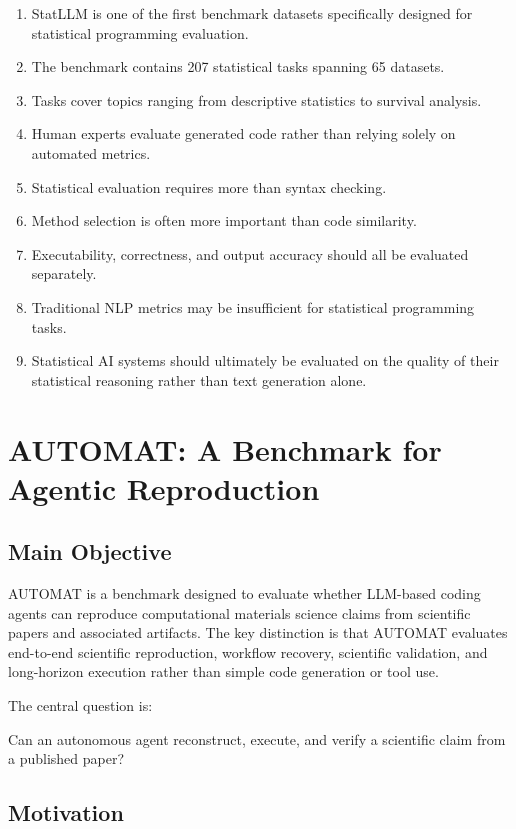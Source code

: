 \documentclass[11pt]{article}
\begin{document}
\begin{enumerate}
    \item StatLLM is one of the first benchmark datasets specifically designed for statistical programming evaluation.
    \item The benchmark contains 207 statistical tasks spanning 65 datasets.
    \item Tasks cover topics ranging from descriptive statistics to survival analysis.
    \item Human experts evaluate generated code rather than relying solely on automated metrics.
    \item Statistical evaluation requires more than syntax checking.
    \item Method selection is often more important than code similarity.
    \item Executability, correctness, and output accuracy should all be evaluated separately.
    \item Traditional NLP metrics may be insufficient for statistical programming tasks.
    \item Statistical AI systems should ultimately be evaluated on the quality of their statistical reasoning rather than text generation alone.
\end{enumerate}

\section{AUTOMAT: A Benchmark for Agentic Reproduction}

\subsection*{Main Objective}

AUTOMAT is a benchmark designed to evaluate whether LLM-based coding agents can reproduce computational materials science claims from scientific papers and associated artifacts.
The key distinction is that AUTOMAT evaluates end-to-end scientific reproduction, workflow recovery, scientific validation, and long-horizon execution rather than simple code generation or tool use.

The central question is:

Can an autonomous agent reconstruct, execute, and verify a scientific claim from a published paper?

\subsection*{Motivation}
\end{document}
